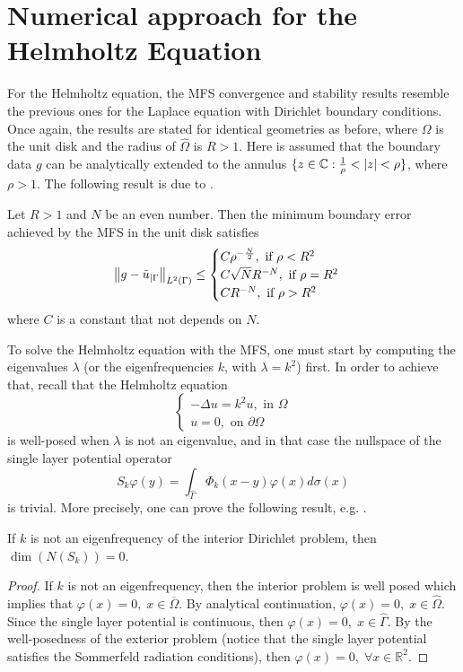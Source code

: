 \section{Numerical approach for the Helmholtz Equation}
For the Helmholtz equation, the MFS convergence and stability results resemble the previous ones for the Laplace equation with Dirichlet boundary conditions. Once again, the results are stated for identical geometries as before, where \(\Omega\) is the unit disk and the radius of \(\hat{\Omega}\) is \(R>1\). Here is assumed that the boundary data \(g\) can be analytically extended to the annulus \(\{z \in \mathbb{C}: \frac{1}{\rho}< \abs{z} < \rho\}\), where \(\rho > 1\). The following result is due to \cite{barnett2008stability}.
\begin{theorem}
    Let \(R > 1\) and \(N\) be an even number. Then the minimum boundary error achieved by the MFS in the unit disk satisfies
    \[
        \norm{g - \tilde{u}_{|\Gamma}}_{L^2(\Gamma)} \leq 
        \begin{cases}
            C \rho^{-\frac{N}{2}}, \text{ if } \rho < R^2\\
            C \sqrt{N} R^{-N}, \text{ if } \rho = R^2\\
            C R^{-N}, \text{ if } \rho > R^2\\
        \end{cases}
    \]
    where \(C\) is a constant that not depends on \(N\).
\end{theorem}
To solve the Helmholtz equation with the MFS, one must start by computing the eigenvalues \(\lambda\) (or the eigenfrequencies \(k\), with \(\lambda = k^2\)) first. In order to achieve that, recall that the Helmholtz equation
\begin{equation}\label{helm_dirichlet}
    \begin{cases}
        -\Delta u = k^2 u, \text{ in } \Omega\\
        u = 0, \text{ on } \partial \Omega
    \end{cases}
\end{equation}
is well-posed when \(\lambda\) is not an eigenvalue, and in that case the nullspace of the single layer potential operator
\[
    S_k \varphi(y) = \int_{\hat{\Gamma}} \Phi_k(x-y)\varphi(x) d\sigma(x) 
\]
is trivial. More precisely, one can prove the following result, e.g. \cite{alves2005method}.
\begin{theorem}\label{mfs_helm_null_kern}
    If \(k\) is not an eigenfrequency of the interior Dirichlet problem, then \(\dim \left(N(S_k)\right)=0\).
\end{theorem}
\begin{proof}
    If \(k\) is not an eigenfrequency, then the interior problem is well posed which implies that \(\varphi(x) = 0, \; x \in \overline{\Omega}\). By analytical continuation, \(\varphi(x) = 0, \; x \in \hat{\Omega}\). Since the single layer potential is continuous, then \(\varphi(x) = 0, \; x \in \hat{\Gamma}\). By the well-posedness of the exterior problem (notice that the single layer potential satisfies the Sommerfeld radiation conditions), then \(\varphi(x) = 0, \; \forall x \in \mathbb{R}^2\).
\end{proof}

